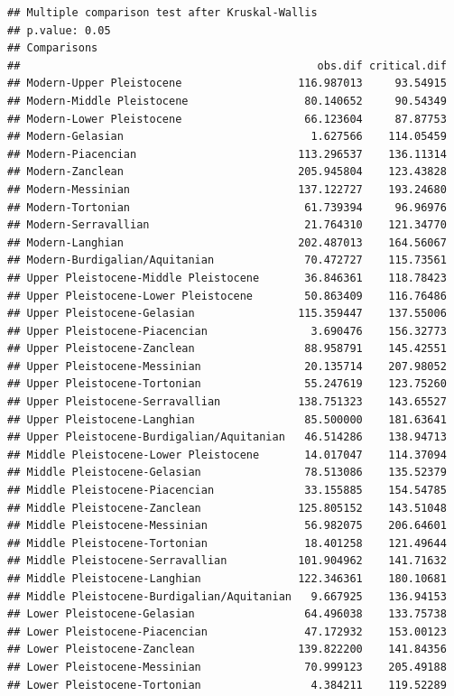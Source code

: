 \documentclass[]{article}
\begin{document}
\begin{verbatim}
## Multiple comparison test after Kruskal-Wallis 
## p.value: 0.05 
## Comparisons
##                                              obs.dif critical.dif
## Modern-Upper Pleistocene                  116.987013     93.54915
## Modern-Middle Pleistocene                  80.140652     90.54349
## Modern-Lower Pleistocene                   66.123604     87.87753
## Modern-Gelasian                             1.627566    114.05459
## Modern-Piacencian                         113.296537    136.11314
## Modern-Zanclean                           205.945804    123.43828
## Modern-Messinian                          137.122727    193.24680
## Modern-Tortonian                           61.739394     96.96976
## Modern-Serravallian                        21.764310    121.34770
## Modern-Langhian                           202.487013    164.56067
## Modern-Burdigalian/Aquitanian              70.472727    115.73561
## Upper Pleistocene-Middle Pleistocene       36.846361    118.78423
## Upper Pleistocene-Lower Pleistocene        50.863409    116.76486
## Upper Pleistocene-Gelasian                115.359447    137.55006
## Upper Pleistocene-Piacencian                3.690476    156.32773
## Upper Pleistocene-Zanclean                 88.958791    145.42551
## Upper Pleistocene-Messinian                20.135714    207.98052
## Upper Pleistocene-Tortonian                55.247619    123.75260
## Upper Pleistocene-Serravallian            138.751323    143.65527
## Upper Pleistocene-Langhian                 85.500000    181.63641
## Upper Pleistocene-Burdigalian/Aquitanian   46.514286    138.94713
## Middle Pleistocene-Lower Pleistocene       14.017047    114.37094
## Middle Pleistocene-Gelasian                78.513086    135.52379
## Middle Pleistocene-Piacencian              33.155885    154.54785
## Middle Pleistocene-Zanclean               125.805152    143.51048
## Middle Pleistocene-Messinian               56.982075    206.64601
## Middle Pleistocene-Tortonian               18.401258    121.49644
## Middle Pleistocene-Serravallian           101.904962    141.71632
## Middle Pleistocene-Langhian               122.346361    180.10681
## Middle Pleistocene-Burdigalian/Aquitanian   9.667925    136.94153
## Lower Pleistocene-Gelasian                 64.496038    133.75738
## Lower Pleistocene-Piacencian               47.172932    153.00123
## Lower Pleistocene-Zanclean                139.822200    141.84356
## Lower Pleistocene-Messinian                70.999123    205.49188
## Lower Pleistocene-Tortonian                 4.384211    119.52289

\end{verbatim}
\end{document}
